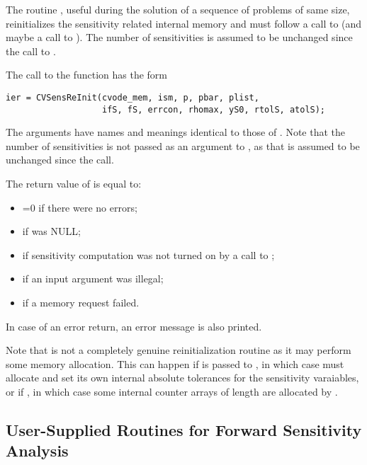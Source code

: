 The routine , useful during the solution of a sequence of problems of 
same size, reinitializes the sensitivity related internal memory 
and must follow a call to  (and maybe a call to ). 
The number  of sensitivities is assumed to be unchanged since the call to 
.

The call to the  function has the form
\begin{verbatim}
ier = CVSensReInit(cvode_mem, ism, p, pbar, plist,
                   ifS, fS, errcon, rhomax, yS0, rtolS, atolS);
\end{verbatim}
The arguments have names and meanings identical to those of .
Note that the number of sensitivities  is not passed as an argument to 
, as that is assumed to be unchanged since the  call. 

The return value  of  is equal to: 
\begin{itemize}
\item {}=0 if there were no errors; 
\item {} if  was NULL;
\item {} if sensitivity computation was not turned on
      by a call to ;
\item {} if an input argument was illegal;
\item {} if a memory request failed.
\end{itemize}
In case of an error return, an error message is also printed.  

Note that  is not a completely genuine reinitialization
routine as it may perform some memory allocation. This can happen
if  is passed to , in which case {\cvodes}
must allocate and set its own internal absolute tolerances for the sensitivity
varaiables, or if , in which case some internal counter
arrays of length  are allocated by .


\subsection{User-Supplied Routines for Forward Sensitivity Analysis}\label{ss:user_fct_fwd}


